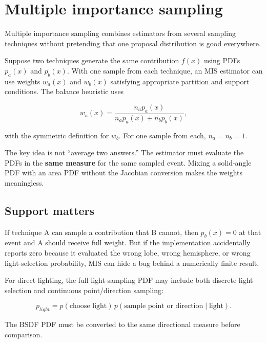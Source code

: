 \hypertarget{appendix-ca8898faf1a6}{}\label{referencestart:appendix-ca8898faf1a6}
\section{Multiple importance sampling}\label{appendix-ca8898faf1a6-multiple-importance-sampling}

\hypertarget{appendix-ca8898faf1a6-multiple-importance-sampling}{}

Multiple importance sampling combines estimators from several sampling techniques without pretending that one proposal distribution is good everywhere.

Suppose two techniques generate the same contribution \(f(x)\) using PDFs \(p_a(x)\) and \(p_b(x)\). With one sample from each technique, an MIS estimator can use weights \(w_a(x)\) and \(w_b(x)\) satisfying appropriate partition and support conditions. The balance heuristic uses

\[
w_a(x)=\frac{n_a p_a(x)}{n_a p_a(x)+n_b p_b(x)},
\]

with the symmetric definition for \(w_b\). For one sample from each, \(n_a=n_b=1\).

The key idea is not ``average two answers.'' The estimator must evaluate the PDFs in the \textbf{same measure} for the same sampled event. Mixing a solid-angle PDF with an area PDF without the Jacobian conversion makes the weights meaningless.

\subsection{Support matters}\label{appendix-ca8898faf1a6-support-matters}

\hypertarget{appendix-ca8898faf1a6-support-matters}{}

If technique A can sample a contribution that B cannot, then \(p_b(x)=0\) at that event and A should receive full weight. But if the implementation accidentally reports zero because it evaluated the wrong lobe, wrong hemisphere, or wrong light-selection probability, MIS can hide a bug behind a numerically finite result.

For direct lighting, the full light-sampling PDF may include both discrete light selection and continuous point/direction sampling:

\[
p_{light}=p(\text{choose light})\,p(\text{sample point or direction}\mid\text{light}).
\]

The BSDF PDF must be converted to the same directional measure before comparison.

